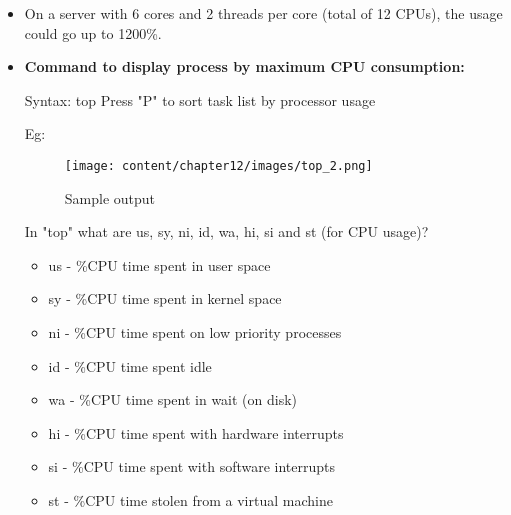 \setlength{\columnsep}{3pt}
\begin{flushleft}

\bigskip
\begin{itemize}
	\item On a server with 6 cores and 2 threads per core (total of 12 CPUs), the usage could go up to 1200\%. 
	\bigskip
	\item \textbf{Command to display process by maximum CPU consumption:}
	\bigskip
	\begin{tcolorbox}[breakable,notitle,boxrule=-0pt,colback=pink,colframe=pink]
		\color{black}
		\font=9pt
		Syntax: top
		\newline
		\color{blue}
		Press "P" to sort task list by processor usage
		\font=4pt
	\end{tcolorbox}
	Eg:
	\begin{figure}[h!]
		\centering
		\texttt{[image: content/chapter12/images/top\_2.png]}
		\caption{Sample output}
		\label{fig:cpu2}
	\end{figure}

	In "top" what are us, sy, ni, id, wa, hi, si and st (for CPU usage)?
	\begin{itemize}
		\item us - \%CPU time spent in user space
		\item sy - \%CPU time spent in kernel space
		\item ni - \%CPU time spent on low priority processes
		\item id - \%CPU time spent idle
		\item wa - \%CPU time spent in wait (on disk)
		\item hi - \%CPU time spent with hardware interrupts
		\item si - \%CPU time spent with software interrupts
		\item st - \%CPU time stolen from a virtual machine
	\end{itemize}
	
	
	
	
\end{itemize}


\end{flushleft}

\newpage


